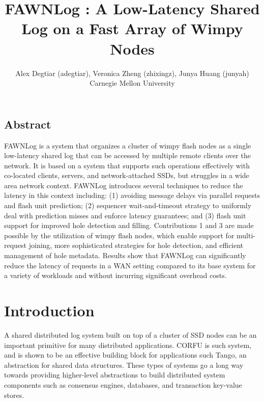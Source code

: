 \documentclass[letterpaper,twocolumn,10pt]{article}
\begin{document}
\date{}
\title{\LARGE \bf FAWNLog : A Low-Latency Shared Log on a Fast Array of Wimpy Nodes}

\author{
{\rm Alex Degtiar (adegtiar), Veronica Zheng (zhixingz), Junya Huang (junyah)}\\
Carnegie Mellon University}

\maketitle

\thispagestyle{firststyle}


\subsection*{Abstract}
FAWNLog is a system that organizes a cluster of wimpy flash nodes as a single low-latency shared log that can be accessed by multiple remote clients over the network. It is based on a system that supports such operations effectively with co-located clients, servers, and network-attached SSDs, but struggles in a wide area network context. FAWNLog introduces several techniques to reduce the latency in this context including: (1) avoiding message delays via parallel requests and flash unit prediction; (2) sequencer wait-and-timeout strategy to uniformly deal with prediction misses and enforce latency guarantees; and (3) flash unit support for improved hole detection and filling. Contributions 1 and 3 are made possible by the utilization of wimpy flash nodes, which enable support for multi-request joining, more sophisticated strategies for hole detection, and efficient management of hole metadata. Results show that FAWNLog can significantly reduce the latency  of requests in a WAN setting compared to its base system for a variety of workloads and without incurring significant overhead costs.

\section{Introduction}
A shared distributed log system built on top of a cluster of SSD nodes can be an important primitive for many distributed applications. CORFU is such system\cite{corfu}, and is shown to be an effective building block for applications such Tango\cite{tango}, an abstraction for shared data structures. These types of systems go a long way towards providing higher-level abstractions to build distributed system components such as consensus engines, databases, and transaction key-value stores.
\end{document}
